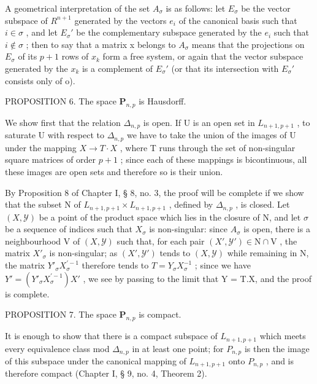 A geometrical interpretation of the set \(A_{\sigma}\) is as follows: let \(E_{\sigma}\) be the vector subspace of \(R^{n+1}\) generated by the vectors \(e_{i}\) of the canonical basis such that \(i \in \sigma\) , and let \(E_{\sigma}'\) be the complementary subspace generated by the \(e_{i}\) such that \(i \notin \sigma\) ; then to say that a matrix x belongs to \(A_{\sigma}\) means that the projections on \(E_{\sigma}\) of its \(p + 1\) rows of \(x_{k}\) form a free system, or again that the vector subspace generated by the \(x_{k}\) is a complement of \(E_{\sigma}'\) (or that its intersection with \(E_{\sigma}'\) consists only of o).

PROPOSITION 6. The space \(\mathbf{P}_{n,p}\) is Hausdorff.

We show first that the relation \(\Delta_{n,p}\) is open. If U is an open set in \(L_{n+1,p+1}\) , to saturate U with respect to \(\Delta_{n,p}\) we have to take the union of the images of U under the mapping \(X \to T \cdot X\) , where T runs through the set of non-singular square matrices of order \(p + 1\) ; since each of these mappings is bicontinuous, all these images are open sets and therefore so is their union.

By Proposition 8 of Chapter I, § 8, no. 3, the proof will be complete if we show that the subset N of \(L_{n+1,p+1} \times L_{n+1,p+1}\) , defined by \(\Delta_{n,p}\) , is closed. Let \((X,\mathcal{Y})\) be a point of the product space which lies in the closure of N, and let \(\sigma\) be a sequence of indices such that \(X_{\sigma}\) is non-singular: since \(A_{\sigma}\) is open, there is a neighbourhood V of \((X,\mathcal{Y})\) such that, for each pair \((X',\mathcal{Y}') \in \mathrm{N} \cap \mathrm{V}\) , the matrix \(X'_{\sigma}\) is non-singular; as \((X',\mathcal{Y}')\) tends to \((X,\mathcal{Y})\) while remaining in N, the matrix \(Y'_{\sigma}X_{\sigma}^{\prime -1}\) therefore tends to \(T = Y_{\sigma}X_{\sigma}^{-1}\) ; since we have \(Y' = (Y'_{\sigma}X_{\sigma}^{\prime -1})X'\) , we see by passing to the limit that Y = T.X, and the proof is complete.

PROPOSITION 7. The space \(\mathbf{P}_{n,p}\) is compact.

It is enough to show that there is a compact subspace of \(L_{n+1, p+1}\) which meets every equivalence class mod \(\Delta_{n,p}\) in at least one point; for \(P_{n,p}\) is then the image of this subspace under the canonical mapping of \(L_{n+1, p+1}\) onto \(P_{n,p}\) , and is therefore compact (Chapter I, § 9, no. 4, Theorem 2).

